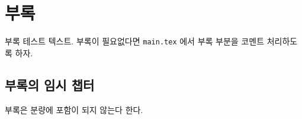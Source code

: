 \section{부록}

부록 테스트 텍스트. 부록이 필요없다면 \texttt{main.tex} 에서 부록 부분을 코멘트 처리하도록 하자.

\subsection{부록의 임시 챕터}

부록은 분량에 포함이 되지 않는다 한다.